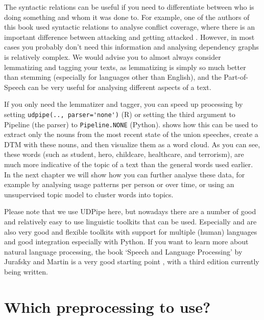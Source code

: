 
The syntactic relations can be useful if you need to differentiate between who is doing something and whom it was done to.
For example, one of the authors of this book used syntactic relations to analyse conflict coverage,
where there is an important difference between attacking and getting attacked \citep{clause}.
However, in most cases you probably don't need this information and analysing dependency graphs is relatively complex.
We would advise you to almost always consider lemmatizing and tagging your texts, as lemmatizing is simply so much better than stemming
(especially for languages other than English), and the Part-of-Speech can be very useful for analysing different aspects of a text. 

If you only need the lemmatizer and tagger, you can speed up processing by setting \verb|udpipe(.., parser='none')| (R) or setting the third argument to Pipeline (the parser) to \verb|Pipeline.NONE| (Python).
 shows how this can be used to extract only the nouns from the most recent state of the union speeches,
create a DTM with these nouns, and then visualize them as a word cloud.
As you can see, these words (such as student, hero, childcare, healthcare, and terrorism), are much more indicative of the topic of a text than the general words used earlier.
In the next chapter we will show how you can further analyse these data, for example by analysing usage patterns per person or over time, or using an unsupervised topic model to cluster words into topics.


Please note that we use UDPipe here, but nowadays there are a number of good and relatively easy to use linguistic toolkits that can be used.
Especially  \citep{spacy} and  \citep{stanza} are also very good and flexible toolkits with support for multiple (human) languages and good integration especially with Python.
If you want to learn more about natural language processing, the book `Speech and Language Processing' by Jurafsky and Martin is a very good starting point \citep{jurafsky}, with a third edition currently being written.


\section{Which preprocessing to use?}

